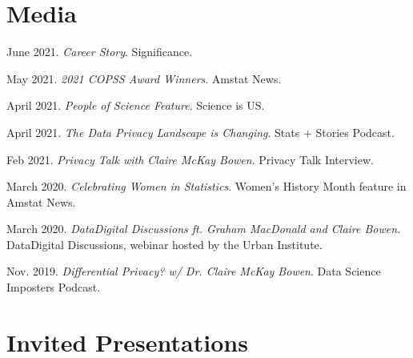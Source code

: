 \documentclass[11pt, letterpaper, roman]{moderncv} %
\begin{document}
\section{Media}
\begin{etaremune}[topsep=0pt, itemsep=2pt, partopsep=0pt, parsep=0pt]

    \item June 2021. \textit{Career Story}. Significance.
    
    \item May 2021. \textit{2021 COPSS Award Winners}. Amstat News.
    
    \item April 2021. \textit{People of Science Feature}. Science is US.
    
    \item April 2021. \textit{The Data Privacy Landscape is Changing}. Stats + Stories Podcast.
    
    \item Feb 2021. \textit{Privacy Talk with Claire McKay Bowen}. Privacy Talk Interview.

    \item March 2020. \textit{Celebrating Women in Statistics}. Women's History Month feature in Amstat News.

    \item March 2020. \textit{Data\@Urban Digital Discussions ft. Graham MacDonald and Claire Bowen}. Data\@Urban Digital Discussions, webinar hosted by the Urban Institute.
    
    \item Nov. 2019. \textit{Differential Privacy? w/ Dr. Claire McKay Bowen}. Data Science Imposters Podcast.
\end{etaremune}


\newpage
\section{Invited Presentations}
\end{document}
